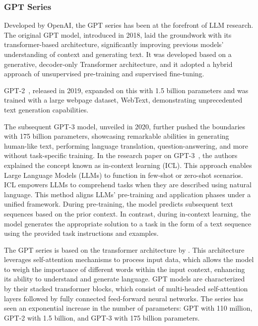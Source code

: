 \subsubsection{GPT Series}
\label{subsubsec:gpt-series}

Developed by OpenAI, the GPT series has been at the forefront of LLM research.
The original GPT model, introduced in 2018, laid the groundwork with its transformer-based architecture, significantly improving previous models' understanding of context and generating text.
It was developed based on a generative, decoder-only Transformer architecture, and it adopted a hybrid approach of unsupervised pre-training and supervised fine-tuning.

GPT-2~\cite{radford2019language}, released in 2019, expanded on this with 1.5 billion parameters and was trained with a large webpage dataset, WebText, demonstrating unprecedented text generation capabilities.

The subsequent GPT-3 model, unveiled in 2020, further pushed the boundaries with 175 billion parameters, showcasing remarkable abilities in generating human-like text, performing language translation, question-answering, and more without task-specific training.
In the research paper on GPT-3~\cite{brown2020language}, the authors explained the concept known as in-context learning (ICL). This approach enables Large Language Models (LLMs) to function in few-shot or zero-shot scenarios.
ICL empowers LLMs to comprehend tasks when they are described using natural language.
This method aligns LLMs' pre-training and application phases under a unified framework.
During pre-training, the model predicts subsequent text sequences based on the prior context.
In contrast, during in-context learning, the model generates the appropriate solution to a task in the form of a text sequence using the provided task instructions and examples.

The GPT series is based on the transformer architecture by \textcite{vaswani2023attention}.
This architecture leverages self-attention mechanisms to process input data, which allows the model to weigh the importance of different words within the input context, enhancing its ability to understand and generate language.
GPT models are characterized by their stacked transformer blocks, which consist of multi-headed self-attention layers followed by fully connected feed-forward neural networks.
The series has seen an exponential increase in the number of parameters: GPT with 110 million, GPT-2 with 1.5 billion, and GPT-3 with 175 billion parameters.

